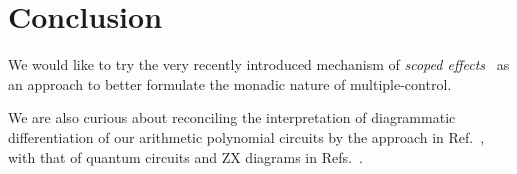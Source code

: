 

\section{Conclusion}

We would like to try the very recently introduced mechanism of \emph{scoped effects}~\cite{lindley2024scoped} as an approach to better formulate the monadic nature of multiple-control.

We are also curious about reconciling the interpretation of diagrammatic differentiation of our arithmetic polynomial circuits by the approach in Ref.~\cite{wilson2023diffpolycirc}, with that of quantum circuits and ZX diagrams in Refs.~\cite{toumi2021diagdiff, wang2022diffintzx, jeandel2024adddiffzx}.